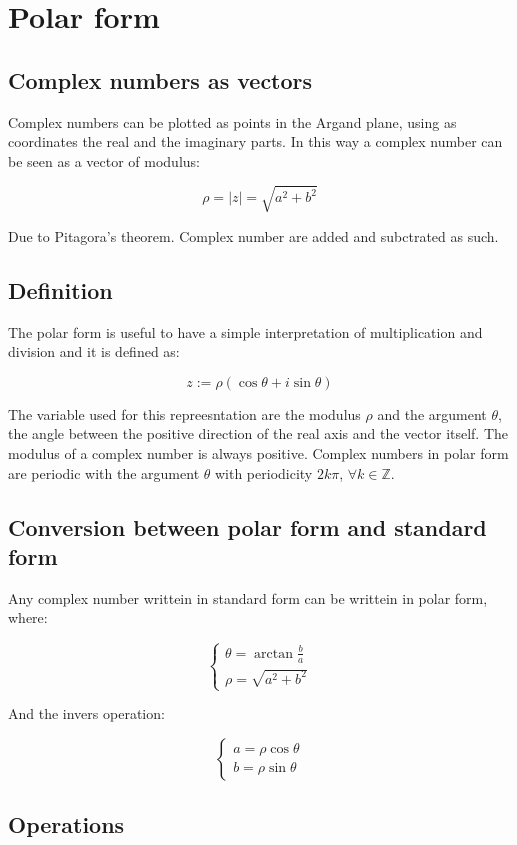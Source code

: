 \section{Polar form}

	\subsection{Complex numbers as vectors}
	Complex numbers can be plotted as points in the Argand plane, using as coordinates the real and the imaginary parts.
	In this way a complex number can be seen as a vector of modulus:

	$$\rho = |z| = \sqrt{a^2+b^2}$$

	Due to Pitagora's theorem.
	Complex number are added and subctrated as such.

	\subsection{Definition}
	The polar form is useful to have a simple interpretation of multiplication and division and it is defined as:

	$$z :=\rho(\cos\theta + i\sin\theta)$$

	The variable used for this repreesntation are the modulus $\rho$ and the argument $\theta$, the angle between the positive direction of the real axis and the vector itself.
	The modulus of a complex number is always positive.
	Complex numbers in polar form are periodic with the argument $\theta$ with periodicity $2k\pi$, $\forall k\in\mathbb{Z}$.

	\subsection{Conversion between polar form and standard form}
	Any complex number writtein in standard form can be writtein in polar form, where:

	$$\begin{cases}
		\theta = \arctan \frac{b}{a}\\
		\rho = \sqrt{a^2 + b^2}
	\end{cases}$$

	And the invers operation:

	$$\begin{cases}
		a = \rho\cos\theta\\
		b = \rho\sin\theta
	\end{cases}$$

	\subsection{Operations}

